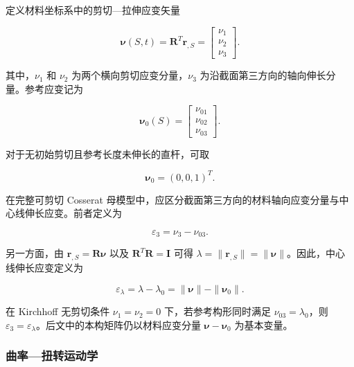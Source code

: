 定义材料坐标系中的剪切---拉伸应变矢量

\begin{equation}
\label{eq:rod-1-8}
\bm{\nu}(S,t) = \mathbf{R}^{T}\mathbf{r}_{,S} = \begin{bmatrix}
\nu_{1} \\
\nu_{2} \\
\nu_{3}
\end{bmatrix}.
\end{equation}

其中，\(\nu_{1}\) 和 \(\nu_{2}\) 为两个横向剪切应变分量，\(\nu_{3}\) 为沿截面第三方向的轴向伸长分量。参考应变记为

\begin{equation}
\label{eq:rod-1-9}
\bm{\nu}_{0}(S) = \begin{bmatrix}
\nu_{01} \\
\nu_{02} \\
\nu_{03}
\end{bmatrix}.
\end{equation}

对于无初始剪切且参考长度未伸长的直杆，可取

\begin{equation}
\label{eq:rod-1-10}
\bm{\nu}_{0} = (0,0,1)^{T}.
\end{equation}

在完整可剪切 Cosserat 母模型中，应区分截面第三方向的材料轴向应变分量与中心线伸长应变。前者定义为

\begin{equation}
\label{eq:rod-1-11}
\varepsilon_{3} = \nu_{3} - \nu_{03}.
\end{equation}

另一方面，由 \(\mathbf{r}_{,S} = \mathbf{R}\bm{\nu}\) 以及 \(\mathbf{R}^{T}\mathbf{R} = \mathbf{I}\) 可得 \(\lambda = \parallel \mathbf{r}_{,S} \parallel = \parallel \bm{\nu} \parallel\)。因此，中心线伸长应变定义为

\begin{equation}
\label{eq:rod-1-12}
\varepsilon_{\lambda} = \lambda - \lambda_{0} = \parallel \bm{\nu} \parallel - \parallel \bm{\nu}_{0} \parallel .
\end{equation}

在 Kirchhoff 无剪切条件 \(\nu_{1} = \nu_{2} = 0\) 下，若参考构形同时满足 \(\nu_{03} = \lambda_{0}\)，则 \(\varepsilon_{3} = \varepsilon_{\lambda}\)。后文中的本构矩阵仍以材料应变分量 \(\bm{\nu} - \bm{\nu}_{0}\) 为基本变量。

\subsubsection{曲率---扭转运动学}\label{sec:rod-1-2-4}

